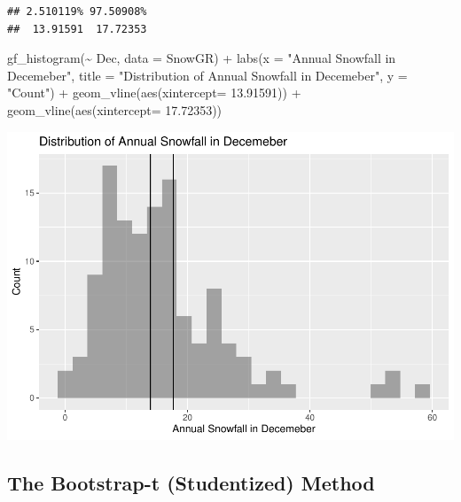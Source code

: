 \documentclass[12pt]{article}
\newenvironment{Shaded}{\begin{snugshade}}{\end{snugshade}}
\newcommand{\AttributeTok}[1]{\textcolor[rgb]{0.77,0.63,0.00}{#1}}
\newcommand{\FloatTok}[1]{\textcolor[rgb]{0.00,0.00,0.81}{#1}}
\newcommand{\FunctionTok}[1]{\textcolor[rgb]{0.00,0.00,0.00}{#1}}
\newcommand{\NormalTok}[1]{#1}
\newcommand{\SpecialCharTok}[1]{\textcolor[rgb]{0.00,0.00,0.00}{#1}}
\newcommand{\StringTok}[1]{\textcolor[rgb]{0.31,0.60,0.02}{#1}}
\begin{document}
\begin{verbatim}
## 2.510119% 97.50908% 
##  13.91591  17.72353
\end{verbatim}

\begin{Shaded}
\begin{Highlighting}[]
\FunctionTok{gf\_histogram}\NormalTok{(}\SpecialCharTok{\textasciitilde{}}\NormalTok{ Dec, }\AttributeTok{data =}\NormalTok{ SnowGR) }\SpecialCharTok{+}
  \FunctionTok{labs}\NormalTok{(}\AttributeTok{x =} \StringTok{"Annual Snowfall in Decemeber"}\NormalTok{, }\AttributeTok{title =} \StringTok{"Distribution of Annual Snowfall in Decemeber"}\NormalTok{, }\AttributeTok{y =} \StringTok{"Count"}\NormalTok{) }\SpecialCharTok{+}
  \FunctionTok{geom\_vline}\NormalTok{(}\FunctionTok{aes}\NormalTok{(}\AttributeTok{xintercept=} \FloatTok{13.91591}\NormalTok{)) }\SpecialCharTok{+}
  \FunctionTok{geom\_vline}\NormalTok{(}\FunctionTok{aes}\NormalTok{(}\AttributeTok{xintercept=} \FloatTok{17.72353}\NormalTok{))}
\end{Highlighting}
\end{Shaded}

\includegraphics{paper_files/figure-latex/unnamed-chunk-17-1.pdf}

\hypertarget{the-bootstrap-t-studentized-method}{%
\subsection{The Bootstrap-t (Studentized)
Method}\label{the-bootstrap-t-studentized-method}}
\end{document}
